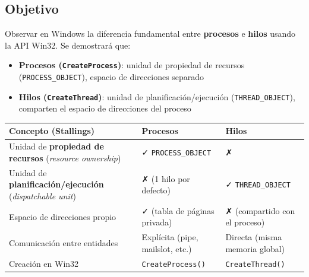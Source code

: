 \documentclass[
  spanish,
]{article}
\newcounter{none} %
\providecommand{\tightlist}{%
  \setlength{\itemsep}{0pt}\setlength{\parskip}{0pt}}
\begin{document}
\subsection{Objetivo}\label{objetivo}

Observar en Windows la diferencia fundamental entre \textbf{procesos} e
\textbf{hilos} usando la API Win32. Se demostrará que:

\begin{itemize}
\tightlist
\item
  \textbf{Procesos (\texttt{CreateProcess})}: unidad de propiedad de
  recursos (\texttt{PROCESS\_OBJECT}), espacio de direcciones separado
\item
  \textbf{Hilos (\texttt{CreateThread})}: unidad de
  planificación/ejecución (\texttt{THREAD\_OBJECT}), comparten el
  espacio de direcciones del proceso
\end{itemize}

{\def\LTcaptype{none} %
\begin{longtable}[]{@{}
  >{\raggedright\arraybackslash}p{}
  >{\raggedright\arraybackslash}p{}
  >{\raggedright\arraybackslash}p{}@{}}
\toprule\noalign{}
\begin{minipage}[b]{\linewidth}\raggedright
Concepto (Stallings)
\end{minipage} & \begin{minipage}[b]{\linewidth}\raggedright
Procesos
\end{minipage} & \begin{minipage}[b]{\linewidth}\raggedright
Hilos
\end{minipage} \\
\midrule\noalign{}
\endhead
\bottomrule\noalign{}
\endlastfoot
Unidad de \textbf{propiedad de recursos} (\emph{resource ownership}) & ✓
\texttt{PROCESS\_OBJECT} & ✗ \\
Unidad de \textbf{planificación/ejecución} (\emph{dispatchable unit}) &
✗ (1 hilo por defecto) & ✓ \texttt{THREAD\_OBJECT} \\
Espacio de direcciones propio & ✓ (tabla de páginas privada) & ✗
(compartido con el proceso) \\
Comunicación entre entidades & Explícita (pipe, mailslot, etc.) &
Directa (misma memoria global) \\
Creación en Win32 & \texttt{CreateProcess()} &
\texttt{CreateThread()} \\
\end{longtable}
}
\end{document}
